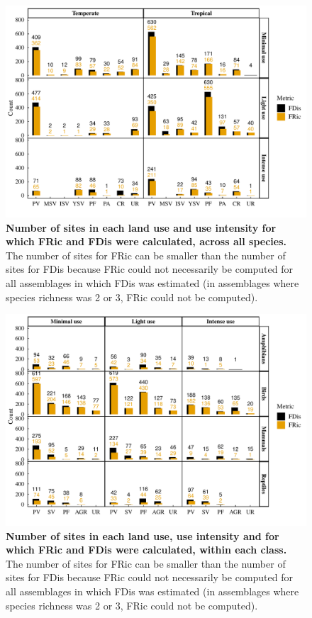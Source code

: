 \begin{figure}[h!]
\centering
\includegraphics[scale=0.8]{Supporting/Chapter3/Figures/SI_samplesizes}
\caption[Number of sites in each land use and use intensity for which FRic and FDis were calculated, across all species]{\textbf{Number of sites in each land use and use intensity for which FRic and FDis were calculated, across all species.} The number of sites for FRic can be smaller than the number of sites for FDis because FRic could not necessarily be computed for all assemblages in which FDis was estimated (in assemblages where species richness was 2 or 3, FRic could not be computed).}
\label{SSAll}
\end{figure}

\pagebreak

\begin{figure}[h!]
\centering
\includegraphics[scale=0.8]{Supporting/Chapter3/Figures/SI_samplesizes_fig3}
\caption[Number of sites in each land use, use intensity and for which FRic and FDis were calculated, within each class]{\textbf{Number of sites in each land use, use intensity and for which FRic and FDis were calculated, within each class.} The number of sites for FRic can be smaller than the number of sites for FDis because FRic could not necessarily be computed for all assemblages in which FDis was estimated (in assemblages where species richness was 2 or 3, FRic could not be computed).}
\label{}
\end{figure}

